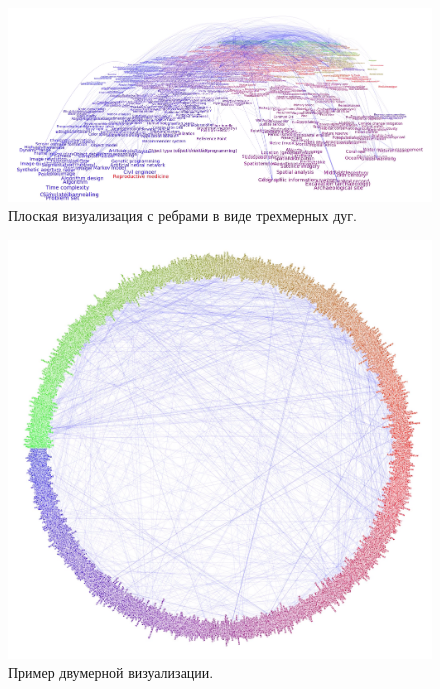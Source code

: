 \begin{figure}[h]
  \centering
  \includegraphics[width=\textwidth]{shots/3dgraph.png}
  \caption{Плоская визуализация с ребрами в виде трехмерных дуг.}
\end{figure}

\begin{figure}[h]
  \centering
  \includegraphics[width=\textwidth]{shots/circle.png}
  \caption{Пример двумерной визуализации.}
\end{figure}

